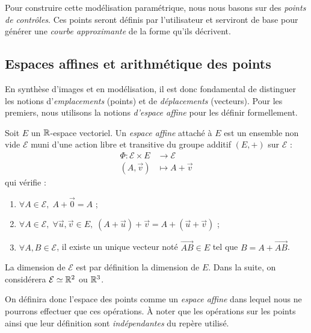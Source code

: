 Pour construire cette modélisation paramétrique, nous nous basons sur des \emph{points de contrôles}. Ces points seront définis par l'utilisateur et serviront de base pour générer une \emph{courbe approximante} de la forme qu'ils décrivent. 

\subsection{Espaces affines et arithmétique des points}

En synthèse d'images et en modélisation, il est donc fondamental de distinguer les notions d'\emph{emplacements} (points) et de \emph{déplacements} (vecteurs). Pour les premiers, nous utilisons la notions \emph{d'espace affine} pour les définir formellement. 

\begin{definition}
    Soit $E$ un $\mathbb{R}$-espace vectoriel. Un \emph{espace affine} attaché à $E$ est un ensemble non vide $\mathcal{E}$ muni d'une action libre et transitive du groupe additif $(E, +)$ sur $\mathcal{E}$ :
    \begin{equation}
        \begin{aligned}
            \Phi : \mathcal{E} \times E &\longrightarrow \mathcal{E} \\
            (A, \vec{v}) &\longmapsto A + \vec{v}
        \end{aligned}
    \end{equation}
    qui vérifie :
    \begin{enumerate}
        \item $\forall A \in \mathcal{E}, \; A + \vec{0} = A$ ;
        \item $\forall A \in \mathcal{E}, \; \forall \vec{u}, \vec{v} \in E, \; (A + \vec{u}) + \vec{v} = A + (\vec{u} + \vec{v})$ ;
        \item $\forall A, B \in \mathcal{E}$, il existe un unique vecteur noté $\vec{AB} \in E$ tel que $B = A + \vec{AB}$.
    \end{enumerate}
    La dimension de $\mathcal{E}$ est par définition la dimension de $E$. Dans la suite, on considérera $\mathcal{E} \simeq \mathbb{R}^2$ ou $\mathbb{R}^3$.
\end{definition}

On définira donc l'espace des points comme un \emph{espace affine} dans lequel nous ne pourrons effectuer que ces opérations. À noter que les opérations sur les points ainsi que leur définition sont \emph{indépendantes} du repère utilisé. 

